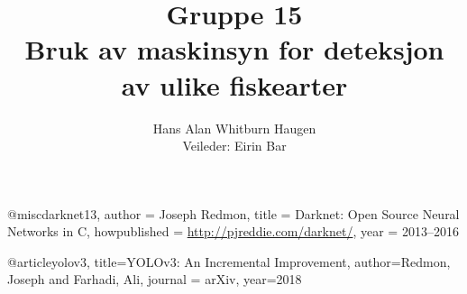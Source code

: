 \documentclass[11ot]{article}
\title{Gruppe 15\\Bruk av maskinsyn for deteksjon av ulike fiskearter}
\author{Hans Alan Whitburn Haugen\\Veileder: Eirin Bar}
\begin{document}

\newpage

\newpage

\tableofcontents
\clearpage
{}
\setcounter{page}{0}




@misc{darknet13,
  author =   {Joseph Redmon},
  title =    {Darknet: Open Source Neural Networks in C},
  howpublished = {\url{http://pjreddie.com/darknet/}},
  year = {2013--2016}
}

@article{yolov3,
  title={YOLOv3: An Incremental Improvement},
  author={Redmon, Joseph and Farhadi, Ali},
  journal = {arXiv},
  year={2018}
}
\end{document}

